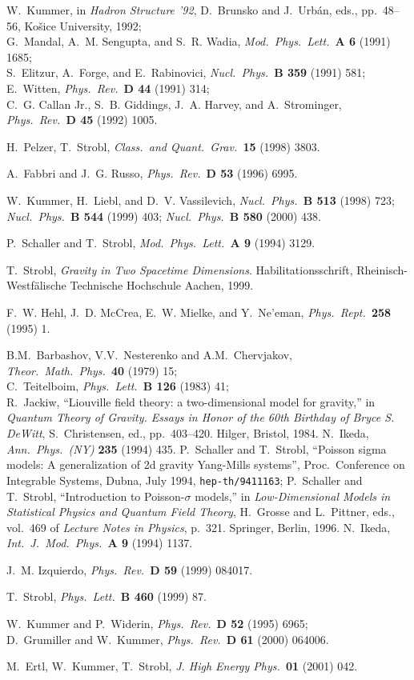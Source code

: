 \documentclass[a4paper,10pt]{article}
\renewcommand{\^}{{}^}
\renewcommand{\_}{\!{}_}
\newcommand\ap[3]    
		{{\it Ann.\ Phys.\ (NY) }{\bf #1} (#2) #3}
\newcommand\cqg[3]  
		{{\it Class.\ and Quant.\ Grav.\ }{\bf #1} (#2) #3}
\newcommand\ijmpa[3] 
		{{\it Int.\ J.\ Mod.\ Phys.\ }{\bf A #1} (#2) #3}
\newcommand\jhep[3]  
		{{\it J. High Energy Phys.\ }{\bf #1} (#2) #3}
\newcommand\mpla[3]  
		{{\it Mod.\ Phys.\ Lett.\ }{\bf A #1} (#2) #3}
\newcommand\npb[3]   
		{{\it Nucl.\ Phys.\ }{\bf B #1} (#2) #3}
\newcommand\plb[3]   
		{{\it Phys.\ Lett.\ }{\bf B #1} (#2) #3}
\newcommand\prd[3]   
		{{\it Phys.\ Rev.\ }{\bf D #1} (#2) #3}
\newcommand\prep[3]  
		{{\it Phys.\ Rept.\ }{\bf #1} (#2) #3}
\newcommand\tmp[3]
		{{\it Theor.\ Math.\ Phys.\ }{\bf #1} (#2) #3}
\begin{document}
\begin{thebibliography}{99}
W.~Kummer, 
in {\em Hadron Structure '92}, D.~Brunsko and J.~Urb\'an, eds.,
  pp.~48--56, 
\newblock Ko\v sice University, 1992; \\

G.~Mandal, A.~M. Sengupta, and S.~R. Wadia, 
\mpla{6}{1991}{1685}; \\
S.~Elitzur, A.~Forge, and E.~Rabinovici, 
\npb{359}{1991}{581}; \\
E.~Witten, \prd{44}{1991}{314}; \\
C.~G. {Callan Jr.}, S.~B. Giddings, J.~A. Harvey, and A.~Strominger,
\prd{45}{1992}{1005}. 

H.\ Pelzer, T.\ Strobl, \cqg{15}{1998}{3803}. 

A.~Fabbri and J.~G. Russo, \prd{53}{1996}{6995}.  

W.~Kummer, H.~Liebl, and D.~V. Vassilevich, 
\npb{513}{1998}{723}; 
\npb{544}{1999}{403};  
\npb{580}{2000}{438}.  

P.~Schaller and T.~Strobl, \mpla{9}{1994}{3129}.  

T.~Strobl, {\em Gravity in Two Spacetime Dimensions}.
\newblock Habilitationsschrift, Rheinisch-Westf\"alische Technische Hochschule
  Aachen, 1999.

F.~W. Hehl, J.~D. McCrea, E.~W. Mielke, and Y.~Ne{'e}man, 
\prep{258}{1995}{1}. 

B.M.\ Barbashov, V.V.\ Nesterenko and A.M.\ Chervjakov, 
\tmp{40}{1979}{15}; \\
C.\ Teitelboim, \plb{126}{1983}{41}; \\
R.~Jackiw, ``{L}iouville field theory: a two-dimensional model for gravity,''
  in {\em Quantum Theory of Gravity. Essays in Honor of the 60th Birthday of
  Bryce S. DeWitt}, S.~Christensen, ed., pp.~403--420.
\newblock Hilger, Bristol, 1984.
N.\ Ikeda, \ap{235}{1994}{435}. 
P.~Schaller and T.~Strobl, ``{P}oisson sigma models: {A} generalization of 2d
  gravity {Y}ang-{M}ills systems'', Proc.\ Conference on 
  Integrable Systems, Dubna, July 1994, 
  \texttt{hep-th/9411163}; 
P.~Schaller and T.~Strobl, ``Introduction to {Poisson-$\sigma$} models,'' in
  {\em Low-Dimensional Models in Statistical Physics and Quantum Field Theory},
  H.~Grosse and L.~Pittner, eds., vol.~469 of {\em Lecture Notes in Physics},
  p.~321.
\newblock Springer, Berlin, 1996.
N.\ Ikeda, \ijmpa{9}{1994}{1137}. 

J.~M. Izquierdo, \prd{59}{1999}{084017}.

T.~Strobl, \plb{460}{1999}{87}. 

W.~Kummer and P.~Widerin, \prd{52}{1995}{6965};\\ 
D.~Grumiller and W.~Kummer, 
\prd{61}{2000}{064006}.  

M.\ Ertl, W.\ Kummer, T.\ Strobl,  
\jhep{01}{2001}{042}. 

\end{thebibliography}
\end{document}
